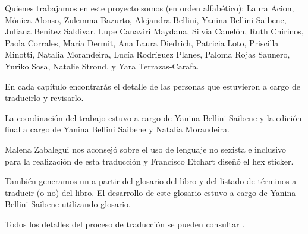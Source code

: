 Quienes trabajamos en este proyecto somos (en orden alfabético):
Laura Acion,
Mónica Alonso,
Zulemma Bazurto,
Alejandra Bellini,
Yanina Bellini Saibene,
Juliana Benitez Saldivar,
Lupe Canaviri Maydana,
Silvia Canelón,
Ruth Chirinos,
Paola Corrales,
María Dermit,
Ana Laura Diedrich,
Patricia Loto,
Priscilla Minotti,
Natalia Morandeira,
Lucía Rodríguez Planes,
Paloma Rojas Saunero,
Yuriko Sosa,
Natalie Stroud,
y Yara Terrazas-Carafa.

En cada capítulo encontrarás el detalle de las personas que estuvieron a cargo de traducirlo
y revisarlo.

La coordinación del trabajo estuvo a cargo de Yanina Bellini Saibene y 
la edición final a cargo de Yanina Bellini Saibene y Natalia Morandeira.

Malena Zabalegui nos aconsejó sobre el uso de lenguaje no sexista e 
inclusivo para la realización de esta traducción y Francisco Etchart 
diseñó el hex sticker.

También generamos un
a partir del glosario del libro y del listado de términos 
a traducir (o no) del libro.
El desarrollo de este glosario estuvo a cargo de Yanina Bellini Saibene utilizando
{glosario}{}.

Todos los detalles del proceso de traducción se pueden consultar
.
